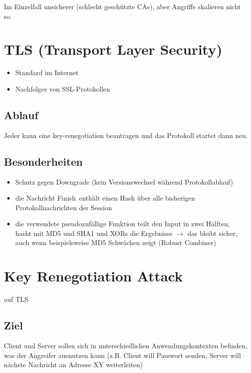 \documentclass[a4paper,twoside,DIV15,BCOR12mm]{scrbook}
\begin{document}
Im Einzelfall unsicherer (schlecht geschützte CAs), aber Angriffe skalieren nicht so.

\section{TLS (Transport Layer Security)}

\begin{itemize}
	\item Standard im Internet
	\item Nachfolger von SSL-Protokollen
\end{itemize}

\subsection{Ablauf}


Jeder kann eine key-renegotiation beantragen und das Protokoll startet dann neu.

\subsection{Besonderheiten}

\begin{itemize}
	\item Schutz gegen Downgrade (kein Versionswechsel während Protokollablauf)
	\item die Nachricht \glqq Finish\grqq\ enthält einen Hash über alle bisherigen Protokollnachrichten der Session
	\item die verwendete pseudozufällige Funktion teilt den Input in zwei Hälften, hasht mit MD5 und SHA1 und XORs die Ergebnisse $\rightarrow$ das bleibt sicher, auch wenn beispielsweise MD5 Schwächen zeigt (\glqq Robust Combiner\grqq)
\end{itemize}
		
\section{Key Renegotiation Attack}

auf TLS

\subsection{Ziel} 

Client und Server sollen sich in unterschiedlichen Anwendungskontexten befinden, was der Angreifer ausnutzen kann (z.B. Client will Passwort senden, Server will nächste Nachricht an Adresse XY weiterleiten)
\end{document}
